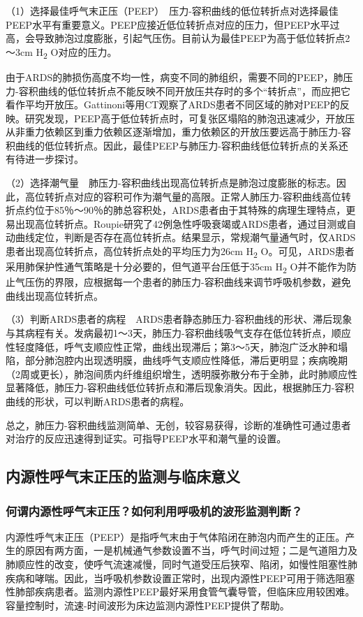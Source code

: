 （1）选择最佳呼气末正压（PEEP）　压力-容积曲线的低位转折点对选择最佳PEEP水平有重要意义。PEEP应接近低位转折点对应的压力，但PEEP水平过高，会导致肺泡过度膨胀，引起气压伤。目前认为最佳PEEP为高于低位转折点2～3cm
H\textsubscript{2} O对应的压力。

由于ARDS的肺损伤高度不均一性，病变不同的肺组织，需要不同的PEEP，肺压力-容积曲线的低位转折点不能反映不同开放压共存时的多个“转折点”，而应把它看作平均开放压。Gattinoni等用CT观察了ARDS患者不同区域的肺对PEEP的反映。研究发现，PEEP高于低位转折点时，可复张区塌陷的肺泡迅速减少，开放压从非重力依赖区到重力依赖区逐渐增加，重力依赖区的开放压要远高于肺压力-容积曲线的低位转折点。因此，最佳PEEP与肺压力-容积曲线低位转折点的关系还有待进一步探讨。

（2）选择潮气量　肺压力-容积曲线出现高位转折点是肺泡过度膨胀的标志。因此，高位转折点对应的容积可作为潮气量的高限。正常人肺压力-容积曲线高位转折点约位于85％～90％的肺总容积处，ARDS患者由于其特殊的病理生理特点，更易出现高位转折点。Roupie研究了42例急性呼吸衰竭或ARDS患者，通过目测或自动曲线定位，判断是否存在高位转折点。结果显示，常规潮气量通气时，仅ARDS患者出现高位转折点，高位转折点处的平均压力为26cm
H\textsubscript{2}
O。可见，ARDS患者采用肺保护性通气策略是十分必要的，但气道平台压低于35cm
H\textsubscript{2}
O并不能作为防止气压伤的界限，应根据每一个患者的肺压力-容积曲线来调节呼吸机参数，避免曲线出现高位转折点。

（3）判断ARDS患者的病程　ARDS患者静态肺压力-容积曲线的形状、滞后现象与其病程有关。发病最初1～3天，肺压力-容积曲线吸气支存在低位转折点，顺应性轻度降低，呼气支顺应性正常，曲线出现滞后；第3～5天，肺泡广泛水肿和塌陷，部分肺泡腔内出现透明膜，曲线呼气支顺应性降低，滞后更明显；疾病晚期（2周或更长），肺泡间质内纤维组织增生，透明膜弥散分布于全肺，此时肺顺应性显著降低，肺压力-容积曲线低位转折点和滞后现象消失。因此，根据肺压力-容积曲线的形状，可以判断ARDS患者的病程。

总之，肺压力-容积曲线监测简单、无创，较容易获得，诊断的准确性可通过患者对治疗的反应迅速得到证实。可指导PEEP水平和潮气量的设置。

\subsection{内源性呼气末正压的监测与临床意义}

\subsubsection{何谓内源性呼气末正压？如何利用呼吸机的波形监测判断？}

内源性呼气末正压（PEEP）是指呼气末由于气体陷闭在肺泡内而产生的正压。产生的原因有两方面，一是机械通气参数设置不当，呼气时间过短；二是气道阻力及肺顺应性的改变，使呼气流速减慢，同时气道受压后狭窄、陷闭，如慢性阻塞性肺疾病和哮喘。因此，当呼吸机参数设置正常时，出现内源性PEEP可用于筛选阻塞性肺部疾病患者。监测内源性PEEP最好采用食管气囊导管，但临床应用较困难。容量控制时，流速-时间波形为床边监测内源性PEEP提供了帮助。

